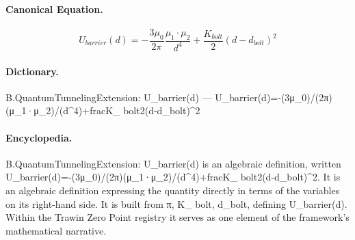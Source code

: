\paragraph{Canonical Equation.}
\[
U_{barrier}(d)=-\frac{3\mu_0}{2\pi}\frac{\mu_1\cdot\mu_2}{d^4}+\frac{K_{ bolt}}{2}(d-d_{bolt})^2
\]

\paragraph{Dictionary.}
B.QuantumTunnelingExtension: U\_barrier(d) — U\_barrier(d)=-(3μ\_0)/(2π)(μ\_1·μ\_2)/(d\textasciicircum{}4)+fracK\_ bolt2(d-d\_bolt)\textasciicircum{}2

\paragraph{Encyclopedia.}
B.QuantumTunnelingExtension: U\_barrier(d) is an algebraic definition, written U\_barrier(d)=-(3μ\_0)/(2π)(μ\_1·μ\_2)/(d\textasciicircum{}4)+fracK\_ bolt2(d-d\_bolt)\textasciicircum{}2. It is an algebraic definition expressing the quantity directly in terms of the variables on its right-hand side. It is built from π, K\_ bolt, d\_bolt, defining U\_barrier(d). Within the Trawin Zero Point registry it serves as one element of the framework's mathematical narrative.
